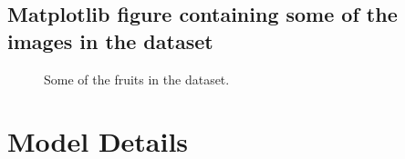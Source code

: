 \documentclass[a4paper,oneside,11pt]{book}
\begin{document}
\section{Matplotlib figure containing some of the images in the dataset}
\begin{figure}[H]
    \centering
    \caption{Some of the fruits in the dataset.}
\end{figure}
\chapter{Model Details}
\end{document}
